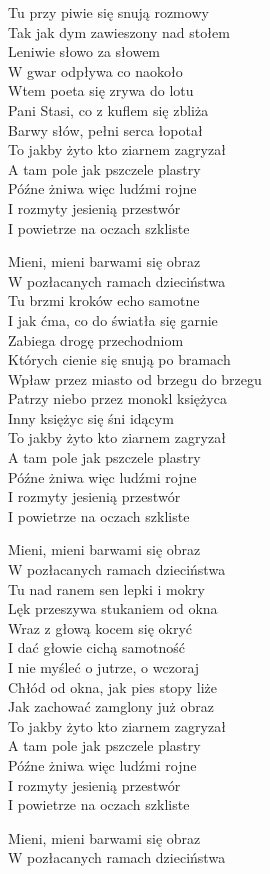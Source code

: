 \begin{text}
    Tu przy piwie się snują rozmowy\\
    Tak jak dym zawieszony nad stołem\\
    Leniwie słowo za słowem\\
    W gwar odpływa co naokoło\\
    Wtem poeta się zrywa do lotu\\
    Pani Stasi, co z kuflem się zbliża\\
    Barwy słów, pełni serca łopotał\\
    To jakby żyto kto ziarnem zagryzał\\
    A tam pole jak pszczele plastry\\
    Późne żniwa więc ludźmi rojne\\
    I rozmyty jesienią przestwór\\
    I powietrze na oczach szkliste

    Mieni, mieni barwami się obraz\\
    W pozłacanych ramach dzieciństwa\\
    Tu brzmi kroków echo samotne\\
    I jak ćma, co do światła się garnie\\
    Zabiega drogę przechodniom\\
    Których cienie się snują po bramach\\
    Wpław przez miasto od brzegu do brzegu\\
    Patrzy niebo przez monokl księżyca\\
    Inny księżyc się śni idącym\\
    To jakby żyto kto ziarnem zagryzał\\
    A tam pole jak pszczele plastry\\
    Późne żniwa więc ludźmi rojne\\
    I rozmyty jesienią przestwór\\
    I powietrze na oczach szkliste

    Mieni, mieni barwami się obraz\\
    W pozłacanych ramach dzieciństwa\\
    Tu nad ranem sen lepki i mokry\\
    Lęk przeszywa stukaniem od okna\\
    Wraz z głową kocem się okryć\\
    I dać głowie cichą samotność\\
    I nie myśleć o jutrze, o wczoraj\\
    Chłód od okna, jak pies stopy liże\\
    Jak zachować zamglony już obraz\\
    To jakby żyto kto ziarnem zagryzał\\
    A tam pole jak pszczele plastry\\
    Późne żniwa więc ludźmi rojne\\
    I rozmyty jesienią przestwór\\
    I powietrze na oczach szkliste

    Mieni, mieni barwami się obraz\\
    W pozłacanych ramach dzieciństwa
\end{text}
\begin{chord}

\end{chord}